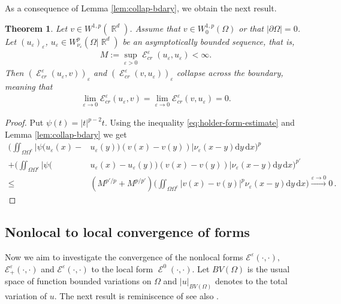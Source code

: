 \documentclass[12pt, reqno]{amsart}%
\theoremstyle{plain}  %
\newtheorem{theorem}{Theorem}[section]
\theoremstyle{definition}  %
\numberwithin{equation}{section}
\DeclareMathOperator{\cE}{\mathcal{E}}
\DeclareMathOperator{\R}{\mathbb{R}}
\newcommand{\iil}{\iint}
\renewcommand{\d}{\mathrm{d}}
\newcommand{\eps}{\varepsilon}
\begin{document}
\noindent As a consequence of Lemma \ref{lem:collap-bdary}, we obtain the next result.
\begin{theorem}\label{thm:unif-collapse-bdry}
Let $v\in W^{1,p}(\R^d)$. Assume that $v\in W^{1,p}_0(\Omega)$ or that  $|\partial\Omega|=0$.
Let $(u_\eps)_\eps$, $u_\eps\in W^p_{\nu_\eps}(\Omega|\R^d)$ be an asymptotically bounded sequence,  that is,
\begin{align*}
M:=\sup_{\eps>0}  \cE^\eps_{cr}(u_\eps, u_\eps)<\infty.
\end{align*}
Then $(\cE^\eps_{cr}(u_\eps, v))_\eps$ and $(\cE^\eps_{cr}(v, u_\eps))_\eps$  collapse across  the boundary, meaning that
\begin{align*}
\lim_{\eps\to0}\mathcal{E}^{\eps}_{cr}(u_\eps,v)= \lim_{\eps\to0}\mathcal{E}^{\eps}_{cr}(v,u_\eps) =0.
\end{align*}

\end{theorem}


\begin{proof}
Put $\psi(t)=|t|^{p-2}t$. Using the inequality \eqref{eq:holder-form-estimate} and Lemma \ref{lem:collap-bdary} we get
\begin{align*}
\Big(\iint_{\Omega\Omega^c}
\big| \psi(u_{\eps}(x)-&u_{\eps}(y))(v(x)-v(y))\big|\nu_{\eps}(x-y)\d y\,\d x)^{p}\\
+ \Big(\iint_{\Omega\Omega^c}
\big| \psi(&u_{\eps}(x)-u_{\eps}(y))(v(x)-v(y))\big|\nu_{\eps}(x-y)\d y\,\d x\Big)^{p'}\\
\leq &(M^{p'/p} +M^{p/p'} ) \Big(\iil_{\Omega\Omega^c} |v(x)-v(y)|^p\nu_{\eps}(x-y)\d y\,\d x\Big)
\xrightarrow{\eps\to0}0\,.
\end{align*}
\end{proof}

\subsection{Nonlocal to local convergence of forms}
\label{sec:conv-forms}
Now we aim to investigate the convergence of  the nonlocal forms
$\mathcal{E}^{\eps}(\cdot, \cdot ), $ $\mathcal{E}^{\eps}_+(\cdot, \cdot ) $ and $\mathcal{E}^{\eps}(\cdot, \cdot )$ to  the local form $\cE^0(\cdot, \cdot )$. Let $BV(\Omega)$ is the usual space of function bounded variations on $\Omega$ and $|u|_{BV(\Omega)}$ denotes to the total variation of $u.$ The next result is  reminiscence  of \cite[Theorem 3.37]{guy-thesis} see also \cite{Pon04}.
\end{document}
